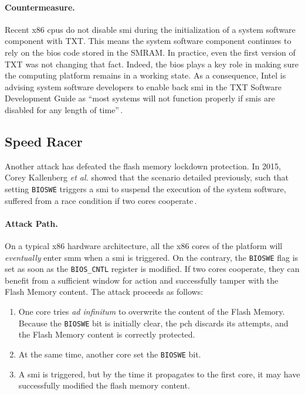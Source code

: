 \paragraph{Countermeasure.}
%
Recent x86 \acp{cpu} do not disable \ac{smi} during the initialization of a
system software component with TXT.
%
This means the system software component continues to rely on the \ac{bios} code
stored in the SMRAM.
%
In practice, even the first version of TXT was not changing that fact.
%
Indeed, the \ac{bios} plays a key role in making sure the computing platform
remains in a working state.
%
As a consequence, Intel is advising system software developers to enable back
\ac{smi} in the TXT Software Development Guide as ``most systems will not
function properly if \acp{smi} are disabled for any length of
time''\,\cite{intel2015txt}.
%

\subsection{Speed Racer}
\label{subsec:usecase:hse:speed}

Another attack has defeated the flash memory lockdown protection.
%
In 2015, Corey Kallenberg \emph{et al.} showed that the scenario detailed
previously, such that setting \texttt{BIOSWE} triggers a \ac{smi} to suspend the
execution of the system software, suffered from a race condition if two cores
cooperate\,\cite{kallenberg2015racecondition}.

\paragraph{Attack Path.}
%
On a typical x86 hardware architecture, all the x86 cores of the platform will
\emph{eventually} enter \ac{smm} when a \ac{smi} is triggered.
%
On the contrary, the \texttt{BIOSWE} flag is set as soon as the
\texttt{BIOS\_CNTL} register is modified.
%
If two cores cooperate, they can benefit from a sufficient window for action and
successfully tamper with the Flash Memory content.
%
The attack proceeds as follows:

\begin{enumerate}
\item One core tries \emph{ad infinitum} to overwrite the content of the Flash
  Memory.
  Because the \texttt{BIOSWE} bit is initially clear, the \ac{pch} discards its
  attempts, and the Flash Memory content is correctly protected.
%
\item At the same time, another core set the \texttt{BIOSWE} bit.
%
\item A \ac{smi} is triggered, but by the time it propagates to the first core,
  it may have successfully modified the flash memory content.
%
\end{enumerate}

